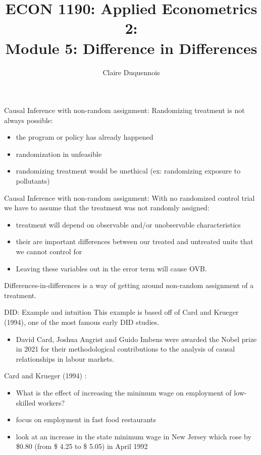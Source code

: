 \documentclass[
  ignorenonframetext,
]{beamer}
\title{ECON 1190: Applied Econometrics 2:\\
Module 5: Difference in Differences}
\author{Claire Duquennois}
\date{}
\providecommand{\tightlist}{%
  \setlength{\itemsep}{0pt}\setlength{\parskip}{0pt}}
\begin{document}
\frame{\titlepage}

\begin{frame}{Causal Inference with non-random assignment:}
\protect\hypertarget{causal-inference-with-non-random-assignment}{}
Randomizing treatment is not always possible:

\begin{itemize}
\item
  the program or policy has already happened
\item
  randomization in unfeasible
\item
  randomizing treatment would be unethical (ex: randomizing exposure to
  pollutants)
\end{itemize}
\end{frame}

\begin{frame}{Causal Inference with non-random assignment:}
\protect\hypertarget{causal-inference-with-non-random-assignment-1}{}
With no randomized control trial we have to assume that the treatment
was not randomly assigned:

\begin{itemize}
\item
  treatment will depend on observable and/or unobservable
  characteristics
\item
  their are important differences between our treated and untreated
  units that we cannot control for
\item
  Leaving these variables out in the error term will cause OVB.
\end{itemize}

Differences-in-differences is a way of getting around non-random
assignment of a treatment.
\end{frame}

\begin{frame}{DID: Example and intuition}
\protect\hypertarget{did-example-and-intuition}{}
This example is based off of Card and Krueger (1994), one of the most
famous early DID studies.

\begin{itemize}
\tightlist
\item
  David Card, Joshua Angrist and Guido Imbens were awarded the Nobel
  prize in 2021 for their methodological contributions to the analysis
  of causal relationships in labour markets.
\end{itemize}

Card and Krueger (1994) :

\begin{itemize}
\item
  What is the effect of increasing the minimum wage on employment of
  low-skilled workers?
\item
  focus on employment in fast food restaurants
\item
  look at an increase in the state minimum wage in New Jersey which rose
  by \$0.80 (from \$ 4.25 to \$ 5.05) in April 1992
\end{itemize}
\end{frame}
\end{document}
